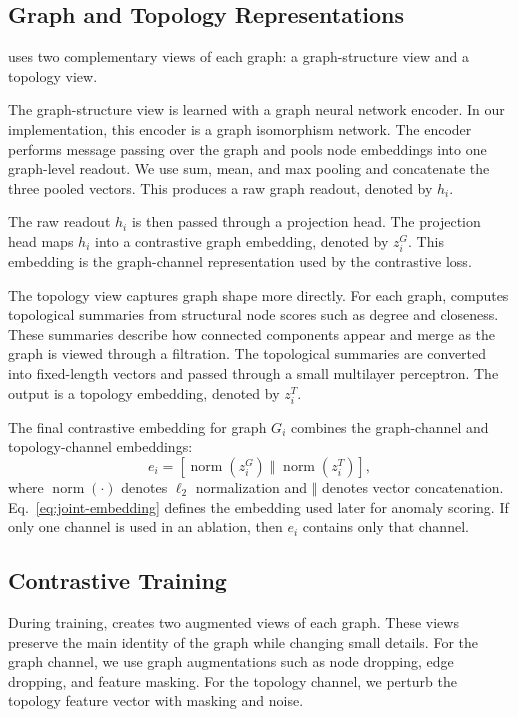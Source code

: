 \subsection{Graph and Topology Representations}

\sysname{} uses two complementary views of each graph: a graph-structure view and a topology view.

The graph-structure view is learned with a graph neural network encoder. In our implementation, this encoder is a graph isomorphism network. The encoder performs message passing over the graph and pools node embeddings into one graph-level readout. We use sum, mean, and max pooling and concatenate the three pooled vectors. This produces a raw graph readout, denoted by $h_i$.

The raw readout $h_i$ is then passed through a projection head. The projection head maps $h_i$ into a contrastive graph embedding, denoted by $z_i^{G}$. This embedding is the graph-channel representation used by the contrastive loss.

The topology view captures graph shape more directly. For each graph, \sysname{} computes topological summaries from structural node scores such as degree and closeness. These summaries describe how connected components appear and merge as the graph is viewed through a filtration. The topological summaries are converted into fixed-length vectors and passed through a small multilayer perceptron. The output is a topology embedding, denoted by $z_i^{T}$.

The final contrastive embedding for graph $G_i$ combines the graph-channel and topology-channel embeddings:
\begin{equation}
    e_i =
    \left[
    \operatorname{norm}(z_i^{G})
    \; \Vert \;
    \operatorname{norm}(z_i^{T})
    \right],
    \label{eq:joint-embedding}
\end{equation}
where $\operatorname{norm}(\cdot)$ denotes $\ell_2$ normalization and $\Vert$ denotes vector concatenation. Eq.~\eqref{eq:joint-embedding} defines the embedding used later for anomaly scoring. If only one channel is used in an ablation, then $e_i$ contains only that channel.

\subsection{Contrastive Training}

During training, \sysname{} creates two augmented views of each graph. These views preserve the main identity of the graph while changing small details. For the graph channel, we use graph augmentations such as node dropping, edge dropping, and feature masking. For the topology channel, we perturb the topology feature vector with masking and noise.

